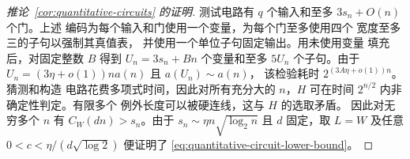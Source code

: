 \begin{proof}[推论~\ref{cor:quantitative-circuits} 的证明]
测试电路有 $q$ 个输入和至多 $3s_n+O(n)$ 个门。上述
编码为每个输入和门使用一个变量，为每个门至多使用四个
宽度至多三的子句以强制其真值表，
并使用一个单位子句固定输出。用未使用变量
填充后，对固定整数 $B$ 得到 $U_n=3s_n+Bn$ 个变量和至多
$5U_n$ 个子句。由于 $U_n=(3\eta+o(1))n a(n)$ 且 $a(U_n)\sim a(n)$，
该检验耗时 $2^{(3A\eta+o(1))n}$。猜测和构造
电路花费多项式时间，因此对所有充分大的 $n$，$H$ 可在时间
$2^{n/2}$ 内非确定性判定。有限多个
例外长度可以被硬连线，这与 $H$ 的选取矛盾。
因此对无穷多个 $n$ 有 $C_W(dn)>s_n$。由于
$s_n\sim\eta n\sqrt{\log_2 n}$ 且 $d$ 固定，取 $L=W$ 及任意
$0<c<\eta/(d\sqrt{\log 2})$ 便证明了 \eqref{eq:quantitative-circuit-lower-bound}。
\end{proof}
